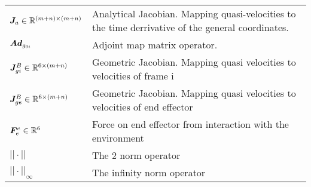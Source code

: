 \begin{longtable}{p{6cm}p{10cm}}
			$\boldsymbol J_{a} \in \mathbb{R}^{(m+n) \times (m+n)} $ & Analytical Jacobian. Mapping quasi-velocities to the time derrivative of the general coordinates. \\
			$ \boldsymbol{Ad}_{g_{0i}}$ & Adjoint map matrix operator. \\
			$\boldsymbol J_{gi}^B \in \mathbb{R}^{6 \times (m+n)}$ & Geometric Jacobian. Mapping quasi velocities to velocities of frame \frame i\\
			$\boldsymbol J_{ge}^B \in \mathbb{R}^{6 \times (m+n)}$ & Geometric Jacobian. Mapping quasi velocities to velocities of end effector\\
			$\boldsymbol F_{e}^{e} \in \mathbb{R}^{6} $ & Force on end effector from interaction with the environment \\
			$|| \cdot ||$ & The 2 norm operator	 \\
			$|| \cdot ||_{\infty} $ & The infinity norm operator	



			
			

    \end{longtable}




\clearpage


